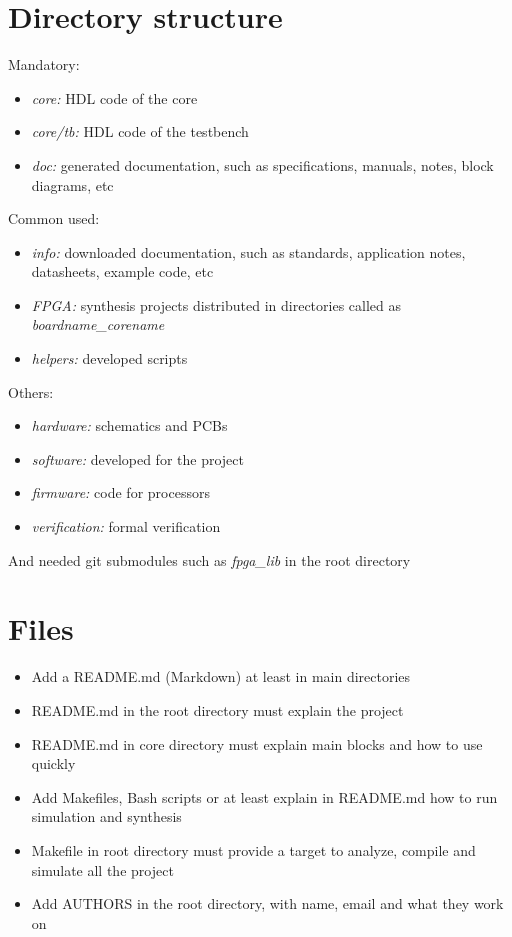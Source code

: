 \documentclass{article}
\begin{document}

\begin{multicols}{3}
  \section*{Directory structure}
    Mandatory:
    \begin{itemize}
      \item \textit{core:} HDL code of the core
      \item \textit{core/tb:} HDL code of the testbench
      \item \textit{doc:} generated documentation, such as specifications, manuals, notes, block diagrams, etc
    \end{itemize}
    Common used:
    \begin{itemize}
      \item \textit{info:} downloaded documentation, such as standards, application notes, datasheets, example code, etc
      \item \textit{FPGA:} synthesis projects distributed in directories called as \textit{boardname\_corename}
      \item \textit{helpers:} developed scripts
    \end{itemize}
    Others:
    \begin{itemize}
      \item \textit{hardware:} schematics and PCBs
      \item \textit{software:} developed for the project
      \item \textit{firmware:} code for processors
      \item \textit{verification:} formal verification
    \end{itemize}
    And needed git submodules such as \textit{fpga\_lib} in the root directory
  \section*{Files}
    \begin{itemize}
      \item Add a README.md (Markdown) at least in main directories
      \item README.md in the root directory must explain the project
      \item README.md in core directory must explain main blocks and how to use quickly
      \item Add Makefiles, Bash scripts or at least explain in README.md how to run simulation and synthesis
      \item Makefile in root directory must provide a target to analyze, compile and simulate all the project
      \item Add AUTHORS in the root directory, with name, email and what they work on
    \end{itemize}

\end{multicols}
\end{document}
